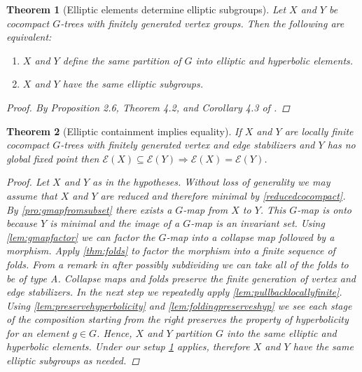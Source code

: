 \documentclass[12pt,parskip=full]{report}
\theoremstyle{plain}
\newtheorem{thm}{Theorem}[section]
\theoremstyle{definition}
\begin{document}
\begin{thm}
    [Elliptic elements determine elliptic subgroups]
    \label{thm:ellelesubgroups} 
    Let \(X\) and \(Y\) be cocompact \(G\)-trees with finitely generated vertex groups. Then the following are equivalent:
    \begin{enumerate}
        \item \(X\) and \(Y\) define the same partition of \(G\) into elliptic and hyperbolic elements.
        \item \(X\) and \(Y\) have the same elliptic subgroups.
    \end{enumerate}

    \begin{proof}
    By Proposition 2.6, Theorem 4.2, and Corollary 4.3 of \cite{foresterdeformationrigidity}.
    \end{proof}
\end{thm}

\begin{thm}
    [Elliptic containment implies equality]
    \label{thm:ellipticimpliesequality} 
    If \(X\) and \(Y\) are locally finite cocompact \(G\)-trees with finitely generated vertex and edge stabilizers and \(Y\) has no global fixed point then \(\mathcal{E}(X) \subseteq \mathcal{E}(Y) \Longrightarrow \mathcal{E}(X) = \mathcal{E}(Y) \). 
\begin{proof}

    Let \(X\) and \(Y\) as in the hypotheses. Without loss of generality we may assume that \(X\) and \(Y\) are reduced and therefore minimal by \ref{reducedcocompact}. By \ref{pro:gmapfromsubset} there exists a \(G\)-map from \(X\) to \(Y\). This \(G\)-map is onto because \(Y\) is minimal and the image of a \(G\)-map is an invariant set. Using \ref{lem:gmapfactor} we can factor the \(G\)-map into a collapse map followed by a morphism. Apply \ref{thm:folds} to factor the morphism into a finite sequence of folds. From a remark in \cite{boundingcomplexity} after possibly subdividing we can take all of the folds to be of type A. Collapse maps and folds preserve the finite generation of vertex and edge stabilizers. In the next step we repeatedly apply \ref{lem:pullbacklocallyfinite}. Using \ref{lem:preservehyperbolicity} and \ref{lem:foldingpreserveshyp} we see each stage of the composition starting from the right preserves the property of hyperbolicity for an element \(g\in G\).  Hence, \(X\) and \(Y\) partition \(G\) into the same elliptic and hyperbolic elements. Under our setup \ref{thm:ellelesubgroups} applies, therefore \(X\) and \(Y\) have the same elliptic subgroups as needed.
\end{proof}
\end{thm}
\end{document}
